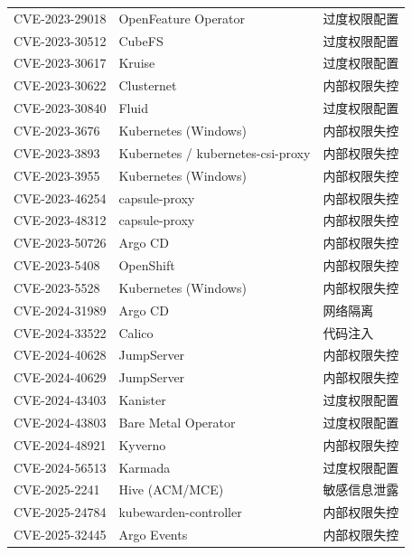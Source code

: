 \begin{longtable}{>{\centering\arraybackslash}p{3.6cm} >{\raggedright\arraybackslash}p{6.8cm} >{\centering\arraybackslash}p{2.8cm}}
CVE-2023-29018    & OpenFeature Operator                          & 过度权限配置     \\
CVE-2023-30512    & CubeFS                                        & 过度权限配置     \\
CVE-2023-30617    & Kruise                                        & 过度权限配置     \\
CVE-2023-30622    & Clusternet                                    & 内部权限失控     \\
CVE-2023-30840    & Fluid                                         & 过度权限配置     \\
CVE-2023-3676     & Kubernetes (Windows)                          & 内部权限失控        \\
CVE-2023-3893     & Kubernetes / kubernetes-csi-proxy             & 内部权限失控        \\
CVE-2023-3955     & Kubernetes (Windows)                          & 内部权限失控        \\
CVE-2023-46254    & capsule-proxy                                 & 内部权限失控     \\
CVE-2023-48312    & capsule-proxy                                 & 内部权限失控     \\
CVE-2023-50726    & Argo CD                                       & 内部权限失控     \\
CVE-2023-5408     & OpenShift                                     & 内部权限失控     \\
CVE-2023-5528     & Kubernetes (Windows)                          & 内部权限失控        \\
CVE-2024-31989    & Argo CD                                       & 网络隔离         \\
CVE-2024-33522    & Calico                                        & 代码注入         \\
CVE-2024-40628    & JumpServer                                    & 内部权限失控     \\
CVE-2024-40629    & JumpServer                                    & 内部权限失控     \\
CVE-2024-43403    & Kanister                                      & 过度权限配置     \\
CVE-2024-43803    & Bare Metal Operator                           & 过度权限配置     \\
CVE-2024-48921    & Kyverno                                       & 内部权限失控     \\
CVE-2024-56513    & Karmada                                       & 过度权限配置     \\
CVE-2025-2241     & Hive (ACM/MCE)                                & 敏感信息泄露     \\
CVE-2025-24784    & kubewarden-controller                         & 内部权限失控     \\
CVE-2025-32445    & Argo Events                                   & 内部权限失控     \\
\end{longtable}
\endgroup

